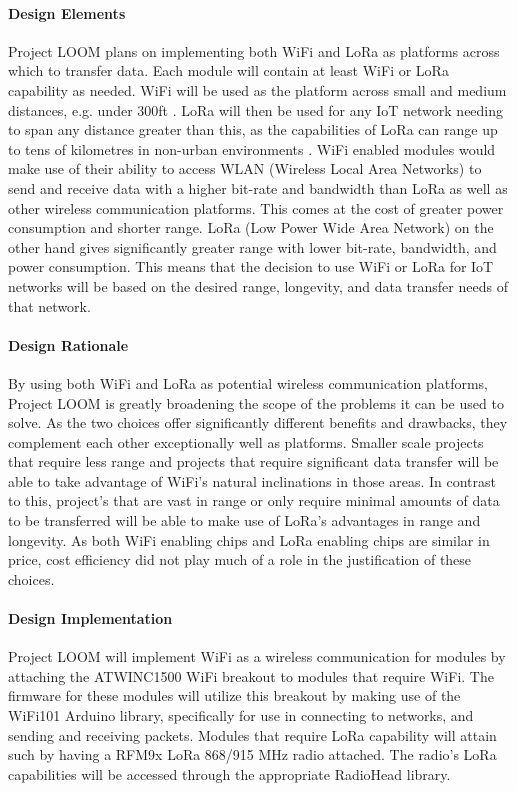 \documentclass[onecolumn, draftclsnofoot,10pt, compsoc]{IEEEtran}
\begin{document}
\paragraph{Design Elements}
    Project LOOM plans on implementing both WiFi and LoRa as platforms across which to transfer data. Each module will contain at least WiFi or LoRa capability as needed. WiFi will be used as the platform across small and medium distances, e.g. under 300ft \cite{WiFi}. LoRa will then be used for any IoT network needing to span any distance greater than this, as the capabilities of LoRa can range up to tens of kilometres in non-urban environments \cite{LoRa}. WiFi enabled modules would make use of their ability to access WLAN (Wireless Local Area Networks) to send and receive data with a higher bit-rate and bandwidth than LoRa as well as other wireless communication platforms. This comes at the cost of greater power consumption and shorter range. LoRa (Low Power Wide Area Network) on the other hand gives significantly greater range with lower bit-rate, bandwidth, and power consumption. This means that the decision to use WiFi or LoRa for IoT networks will be based on the desired range, longevity, and data transfer needs of that network.

\paragraph{Design Rationale}
    By using both WiFi and LoRa as potential wireless communication platforms, Project LOOM is greatly broadening the scope of the problems it can be used to solve. As the two choices offer significantly different benefits and drawbacks, they complement each other exceptionally well as platforms. Smaller scale projects that require less range and projects that require significant data transfer will be able to take advantage of WiFi's natural inclinations in those areas. In contrast to this, project's that are vast in range or only require minimal amounts of data to be transferred will be able to make use of LoRa's advantages in range and longevity. As both WiFi enabling chips and LoRa enabling chips are similar in price, cost efficiency did not play much of a role in the justification of these choices. 

\paragraph{Design Implementation}
    Project LOOM will implement WiFi as a wireless communication for modules by attaching the ATWINC1500 WiFi breakout to modules that require WiFi. The firmware for these modules will utilize this breakout by making use of the WiFi101 Arduino library, specifically for use in connecting to networks, and sending and receiving packets. Modules that require LoRa capability will attain such by having a RFM9x LoRa 868/915 MHz radio attached. The radio's LoRa capabilities will be accessed through the appropriate RadioHead library. 
\end{document}
